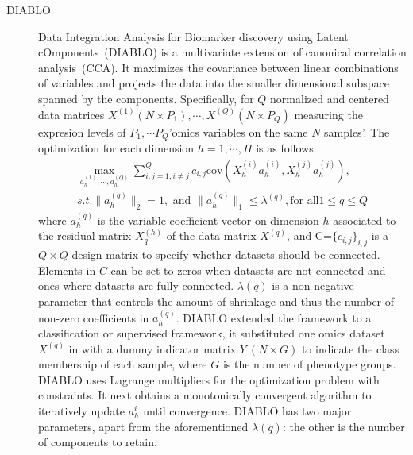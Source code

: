 \begin{description}
  \item[DIABLO]
  Data Integration Analysis for Biomarker discovery using Latent cOmponents~(DIABLO) is a multivariate extension of canonical correlation analysis~(CCA). It maximizes the covariance between linear combinations of variables and projects the data into the smaller dimensional subspace spanned by the components. Specifically, for $Q$ normalized and centered data matrices $X^{(1)}(N\times P_1), \cdots, X^{(Q)}(N\times P_Q)$ measuring the expresion levels of $P_1,\cdots P_Q$'omics variables on the same $N$ samples'. The optimization for each dimension $h=1,\cdots, H$ is as follows:
  \begin{equation}
  \begin{aligned}
  	\underset{a_h^{(1)},\cdots,a_h^{(Q)}}{\max} \sum_{i,j=1, i\neq j}^Q c_{i,j} \text{cov}(X_h^{(i)} a_h^{(i)}, X_h^{(j)} a_h^{(j)}),\\
  	s.t. \|a_h^{(q)}\|_2 = 1, \text{ and } \|a_h^{(q)}\|_1 \leq \lambda^{(q)}, \text{for all} 1\leq q \leq Q
  \end{aligned}
  \label{eqn:sGCCA}
  \end{equation}
  where $a_h^{(q)}$ is the variable coefficient vector on dimension $h$ associated to the residual matrix $X_q^{(h)}$ of the data matrix $X^{(q)}$, and C=$\{c_{i,j}\}_{i,j}$ is a $Q\times Q$ design matrix to specify whether datasets should be connected. Elements in $C$ can be set to zeros when datasets are not connected and ones where datasets are fully connected. $\lambda(q)$ is a non-negative parameter that controls the amount of shrinkage and thus the number of non-zero coefficients in $a_h^{(q)}$. DIABLO extended the framework to a classification or supervised framework, it substituted one omics dataset $X^{(q)}$ in  with a dummy indicator matrix $Y\ (N\times G)$ to indicate the class membership of each sample, where $G$ is the number of phenotype groups. DIABLO uses Lagrange multipliers for the optimization problem with constraints. It next obtains a monotonically convergent algorithm to iteratively update $a_h^{i}$ until convergence. DIABLO has two major parameters, apart from the aforementioned $\lambda(q)$: the other is the number of components to retain. 



\end{description}
